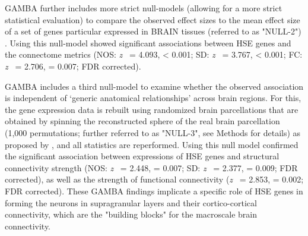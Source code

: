 \begin{refsection}
GAMBA further includes more strict null-models (allowing for a more strict statistical evaluation) to compare the observed effect sizes to the mean effect size of a set of genes particular expressed in BRAIN tissues (referred to as "NULL-2") \citep{Wei2019GeneticMA}. Using this null-model showed significant associations between HSE genes and the connectome metrics (NOS: \textit{z} \ = 4.093, \pval < 0.001; SD: \textit{z} \ = 3.767, \pval < 0.001; FC: \textit{z} \ = 2.706, \pval =  0.007; FDR corrected).


GAMBA includes a third null-model to examine whether the observed association is independent of `generic anatomical relationships' across brain regions. For this, the gene expression data is rebuilt using randomized brain parcellations that are obtained by spinning the reconstructed sphere of the real brain parcellation (1,000 permutations; further referred to as "NULL-3", see Methods for details) as proposed by \citep{AlexanderBloch2018OnTF}, and all statistics are reperformed. Using this null model confirmed the significant association between expressions of HSE genes and structural connectivity strength (NOS: \textit{z} \ = 2.448, \pval =  0.007; SD: \textit{z} \ = 2.377, \pval =  0.009; FDR corrected), as well as the strength of functional connectivity (\textit{z} \ = 2.853, \pval =  0.002; FDR corrected). These GAMBA findings implicate a specific role of HSE genes in forming the neurons in supragranular layers and their cortico-cortical connectivity, which are the "building blocks" for the macroscale brain connectivity.



\end{refsection}
